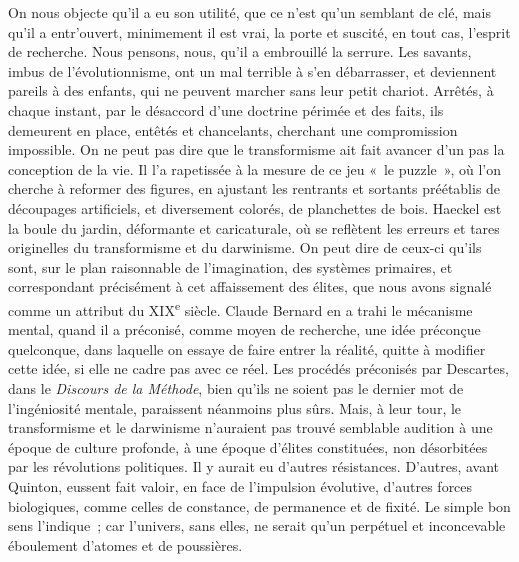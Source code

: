 \documentclass[french,twoside]{book} %
\begin{document}
On nous objecte qu’il a eu son utilité, que ce n’est qu’un semblant de clé, mais qu’il a entr’ouvert, minimement il est vrai, la porte et suscité, en tout cas, l’esprit de recherche. Nous pensons, nous, qu’il a embrouillé la serrure. Les savants, imbus de l’évolutionnisme, ont un mal terrible à s’en débarrasser, et deviennent pareils à des enfants, qui ne peuvent marcher sans leur petit chariot. Arrêtés, à chaque instant, par le désaccord d’une doctrine périmée et des faits, ils demeurent en place, entêtés et chancelants, cherchant une compromission impossible. On ne peut pas dire que le transformisme ait fait avancer d’un pas la conception de la vie. Il l’a rapetissée à la mesure de ce jeu « le puzzle », où l’on cherche à reformer des figures, en ajustant les rentrants et sortants préétablis de découpages artificiels, et diversement colorés, de planchettes de bois. Haeckel est la boule du jardin, déformante et caricaturale, où se reflètent les erreurs et tares originelles du transformisme et du darwinisme. On peut dire de ceux-ci qu’ils sont, sur le plan raisonnable de l’imagination, des systèmes primaires, et correspondant précisément à cet affaissement des élites, que nous avons signalé comme un attribut du XIX\textsuperscript{e} siècle. Claude Bernard en a trahi le mécanisme mental, quand il a préconisé, comme moyen de recherche, une idée préconçue quelconque, dans laquelle on essaye de faire entrer la réalité, quitte à modifier cette idée, si elle ne cadre pas avec ce réel. Les procédés préconisés par Descartes, dans le {\itshape Discours de la Méthode}, bien qu’ils ne soient pas le dernier mot de l’ingéniosité mentale, paraissent néanmoins plus sûrs. Mais, à leur tour, le transformisme et le darwinisme n’auraient pas trouvé semblable audition à une époque de culture profonde, à une époque d’élites constituées, non désorbitées par les révolutions politiques. Il y aurait eu d’autres résistances. D’autres, avant Quinton, eussent fait valoir, en face de l’impulsion évolutive, d’autres forces biologiques, comme celles de constance, de permanence et de fixité. Le simple bon sens l’indique ; car l’univers, sans elles, ne serait qu’un perpétuel et inconcevable éboulement d’atomes et de poussières.\par
\end{document}

